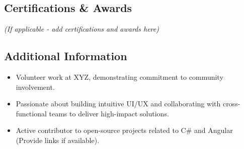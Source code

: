 \documentclass[
]{article}
\providecommand{\tightlist}{%
  \setlength{\itemsep}{0pt}\setlength{\parskip}{0pt}}
\begin{document}
\subsection{\texorpdfstring{\textbf{Certifications \&
Awards}}{Certifications \& Awards}}\label{certifications-awards}

\emph{(If applicable - add certifications and awards here)}

\subsection{\texorpdfstring{\textbf{Additional
Information}}{Additional Information}}\label{additional-information}

\begin{itemize}
\tightlist
\item
  Volunteer work at XYZ, demonstrating commitment to community
  involvement.
\item
  Passionate about building intuitive UI/UX and collaborating with
  cross-functional teams to deliver high-impact solutions.
\item
  Active contributor to open-source projects related to C\# and Angular
  (Provide links if available).
\end{itemize}
\end{document}
